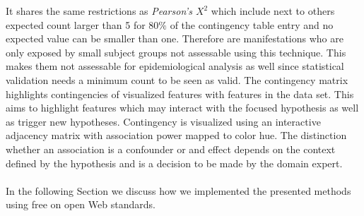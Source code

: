\documentclass[journal]{style/vgtc} 			          %
\begin{document}
It shares the same restrictions as \emph{Pearson's $X^2$} which include next to others expected count larger than 5 for $80\%$ of the contingency table entry and no expected value can be smaller than one.
%
Therefore are manifestations who are only exposed by small subject groups not assessable using this technique.
%
This makes them not assessable for epidemiological analysis as well since statistical validation needs a minimum count to be seen as valid.
The contingency matrix highlights contingencies of visualized features with features in the data set.
%
This aims to highlight features which may interact with the focused hypothesis as well as trigger new hypotheses.
%
Contingency is visualized using an interactive adjacency matrix with association power mapped to color hue.
%
The distinction whether an association is a confounder or and effect depends on the context defined by the hypothesis and is a decision to be made by the domain expert.
\\\\
In the following Section we discuss how we implemented the presented methods using free on open Web standards.
% 
\end{document}
